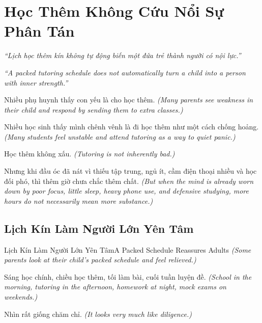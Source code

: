 \chapter{Học Thêm Không Cứu Nổi Sự Phân Tán}

\begin{center}
	\textit{\color{bookprimary}``Lịch học thêm kín không tự động biến một đứa trẻ thành người có nội lực.''}

	\textit{\color{bookprimary}``A packed tutoring schedule does not automatically turn a child into a person with inner strength.''}
\end{center}

\ngancach

\begin{tcolorbox}[colback=bookprimary!6,colframe=bookprimary!35,arc=5pt,title={\bfseries Góc Suy Nghĩ},fonttitle=\bfseries\color{bookprimary}]
Nhiều phụ huynh thấy con yếu là cho học thêm.
\textit{(Many parents see weakness in their child and respond by sending them to extra classes.)}

Nhiều học sinh thấy mình chênh vênh là đi học thêm như một cách chống hoảng.
\textit{(Many students feel unstable and attend tutoring as a way to quiet panic.)}

Học thêm không xấu.
\textit{(Tutoring is not inherently bad.)}

Nhưng khi đầu óc đã nát vì thiếu tập trung, ngủ ít, cầm điện thoại nhiều và học đối phó, thì thêm giờ chưa chắc thêm chất.
\textit{(But when the mind is already worn down by poor focus, little sleep, heavy phone use, and defensive studying, more hours do not necessarily mean more substance.)}
\end{tcolorbox}

\section{Lịch Kín Làm Người Lớn Yên Tâm}
\begin{truyen}{Lịch Kín Làm Người Lớn Yên Tâm}{A Packed Schedule Reassures Adults}
\textit{(Some parents look at their child's packed schedule and feel relieved.)}

Sáng học chính, chiều học thêm, tối làm bài, cuối tuần luyện đề.
\textit{(School in the morning, tutoring in the afternoon, homework at night, mock exams on weekends.)}

Nhìn rất giống chăm chỉ.
\textit{(It looks very much like diligence.)}

\end{truyen}


